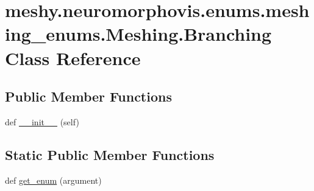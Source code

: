 \hypertarget{classmeshy_1_1neuromorphovis_1_1enums_1_1meshing__enums_1_1Meshing_1_1Branching}{}\section{meshy.\+neuromorphovis.\+enums.\+meshing\+\_\+enums.\+Meshing.\+Branching Class Reference}
\label{classmeshy_1_1neuromorphovis_1_1enums_1_1meshing__enums_1_1Meshing_1_1Branching}


 


\subsection*{Public Member Functions}
\begin{DoxyCompactItemize}
\item 
def \hyperlink{classmeshy_1_1neuromorphovis_1_1enums_1_1meshing__enums_1_1Meshing_1_1Branching_a32ee3b795800dae4e1f5342b04bb0a4a}{\+\_\+\+\_\+init\+\_\+\+\_\+} (self)\hypertarget{classmeshy_1_1neuromorphovis_1_1enums_1_1meshing__enums_1_1Meshing_1_1Branching_a32ee3b795800dae4e1f5342b04bb0a4a}{}\label{classmeshy_1_1neuromorphovis_1_1enums_1_1meshing__enums_1_1Meshing_1_1Branching_a32ee3b795800dae4e1f5342b04bb0a4a}

\end{DoxyCompactItemize}
\subsection*{Static Public Member Functions}
\begin{DoxyCompactItemize}
\item 
def \hyperlink{classmeshy_1_1neuromorphovis_1_1enums_1_1meshing__enums_1_1Meshing_1_1Branching_a889b08c4285f6d097c2c7375fe60d7aa}{get\+\_\+enum} (argument)\hypertarget{classmeshy_1_1neuromorphovis_1_1enums_1_1meshing__enums_1_1Meshing_1_1Branching_a889b08c4285f6d097c2c7375fe60d7aa}{}\label{classmeshy_1_1neuromorphovis_1_1enums_1_1meshing__enums_1_1Meshing_1_1Branching_a889b08c4285f6d097c2c7375fe60d7aa}

\end{DoxyCompactItemize}
